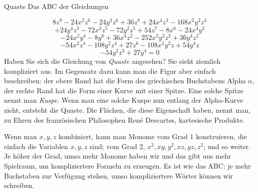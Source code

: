 \begin{surferPage}{Quaste}
Das ABC der Gleichungen

  \smallskip
\[8z^9-24x^2z^6-24y^2z^6+36z^8+24x^4z^3-168x^2y^2z^3\]
\[+24y^4z^3-72x^2z^5-72y^2z^5+54z^7-8x^6-24x^4y^2\]
\[-24x^2y^4-8y^6 + 36x^4z^2-252x^2y^2z^2+36y^4z^2\]
\[- 54x^2z^4-108y^2z^4 + 27z^6-108x^2y^2z + 54y^4z\]
\[-54y^2z^3 + 27y^4 = 0\]
\singlespacing
Haben Sie sich die Gleichung von {\it Quaste} angesehen? Sie sieht ziemlich kompliziert aus. Im Gegensatz dazu kann man die Figur aber einfach beschreiben: der obere Rand hat die Form des griechischen Buchstabens Alpha $\alpha$, der rechte Rand hat die Form einer Kurve mit einer Spitze. Eine solche Spitze nennt man {\it Kuspe}. Wenn man eine solche Kuspe nun entlang der Alpha-Kurve zieht, entsteht die Quaste. Die Flächen, die diese Eigenschaft haben, nennt man, zu Ehren des französischen Philosophen René Descartes, kartesische Produkte.

Wenn man $x,y, z$ kombiniert, kann man Monome vom Grad $1$ konstruieren, die einfach die Variablen $x,y, z $ sind; vom Grad 2,  $x^2, xy, y^2, xz, yz, z^2$; und so weiter. Je höher der Grad, umso mehr Monome haben wir und das gibt uns mehr Spielraum, um kompliziertere Formeln zu erzeugen. Es ist wie das ABC: je mehr Buchstaben zur Verfügung stehen, umso kompliziertere Wörter können wir schreiben.
\end{surferPage}
